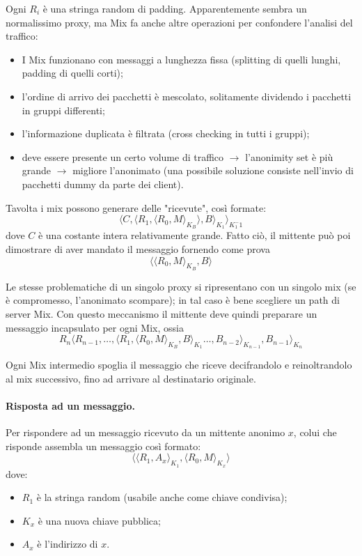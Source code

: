 \documentclass[a4paper, 10pt, twoside]{article}
\begin{document}
	Ogni $R_i$ è una stringa random di padding. Apparentemente sembra un normalissimo proxy, ma Mix fa anche altre operazioni per confondere l'analisi del traffico: \begin{itemize}
		\item I Mix funzionano con messaggi a lunghezza fissa (splitting di quelli lunghi, padding di quelli corti);
		\item l'ordine di arrivo dei pacchetti è mescolato, solitamente dividendo i pacchetti in gruppi differenti;
		\item l'informazione duplicata è filtrata (cross checking in tutti i gruppi);
		\item deve essere presente un certo volume di traffico $\to$ l'anonimity set è più grande $\to$ migliore l'anonimato (una possibile soluzione consiste nell'invio di pacchetti dummy da parte dei client).
	\end{itemize}

	Tavolta i mix possono generare delle "ricevute", così formate: \[ \langle C, \langle R_1, \langle R_0, M\rangle_{K_B}\rangle, B \rangle_{K_1}\rangle_{K_1^-1}  \]
	dove $C$ è una costante intera relativamente grande. Fatto ciò, il mittente può poi dimostrare di aver mandato il messaggio fornendo come prova \[ \langle\langle R_0, M\rangle_{K_B}, B\rangle \]

	Le stesse problematiche di un singolo proxy si ripresentano con un singolo mix (se è compromesso, l'anonimato scompare); in tal caso è bene scegliere un path di server Mix. Con questo meccanismo il mittente deve quindi preparare un messaggio incapsulato per ogni Mix, ossia \[R_n\langle R_{n-1}, \dots, \langle R_1, \langle R_0, M\rangle_{K_B}, B\rangle_{K_1} \dots, B_{n-2}\rangle_{K_{n-1}}, B_{n-1}\rangle_{K_n}\]

	Ogni Mix intermedio spoglia il messaggio che riceve decifrandolo e reinoltrandolo al mix successivo, fino ad arrivare al destinatario originale. 

	\paragraph{Risposta ad un messaggio.} Per rispondere ad un messaggio ricevuto da un mittente anonimo $x$, colui che risponde assembla un messaggio così formato: \[\langle\langle R_1, A_x\rangle_{K_1}, \langle R_0, M\rangle_{K_x}\rangle\] dove: \begin{itemize}
		\item $R_1$ è la stringa random (usabile anche come chiave condivisa);
		\item $K_x$ è una nuova chiave pubblica;
		\item $A_x$ è l'indirizzo di $x$.
	\end{itemize}
\end{document}
